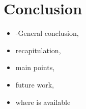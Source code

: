 \section{Conclusion}
\begin{itemize}
    \item -General conclusion,
    \item recapitulation,
    \item main points,
    \item future work,
    \item where is available
\end{itemize}